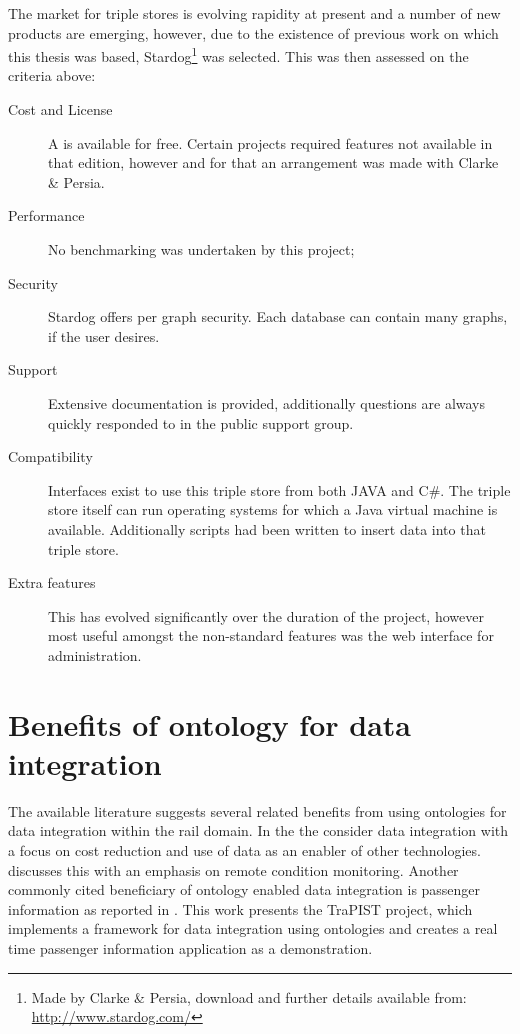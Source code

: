 The market for triple stores is evolving rapidity at present and a number of new products are emerging, however, due to the existence of previous work on which this thesis was based, Stardog\footnote{Made by Clarke \& Persia, download and further details available from: \url{http://www.stardog.com/}} was selected. This was then assessed on the criteria above:

\begin{description}    
    \item[Cost and License] A  is available for free. Certain projects required features not available in that edition, however and for that an arrangement was made with Clarke \& Persia.
    \item[Performance] No benchmarking was undertaken by this project;
    \item[Security] Stardog offers per graph security. Each database can contain many graphs, if the user desires.
    \item[Support] Extensive documentation is provided, additionally questions are always quickly responded to in the public support group.
    \item[Compatibility] Interfaces exist to use this triple store from both JAVA and C\#. The triple store itself can run operating systems for which a Java virtual machine is available.  Additionally scripts had been written to insert data into that triple store.
    \item[Extra features] This has evolved significantly over the duration of the project, however most useful amongst the non-standard features was the web interface for administration. 
\end{description}


\section{Benefits of ontology for data integration}
\label{benefits}
The available literature suggests several related benefits from using ontologies for data integration within the rail domain. In the  the \citet{RDG2017} consider data integration with a focus on cost reduction and use of data as an enabler of other technologies. \citet{Tutcher2013} discusses this with an emphasis on remote condition monitoring. Another commonly cited beneficiary of ontology enabled data integration is passenger information as reported in  \citet{Verstichel2014}. This work presents the TraPIST project, which implements a framework for data integration using ontologies and creates a real time passenger information application as a demonstration.

